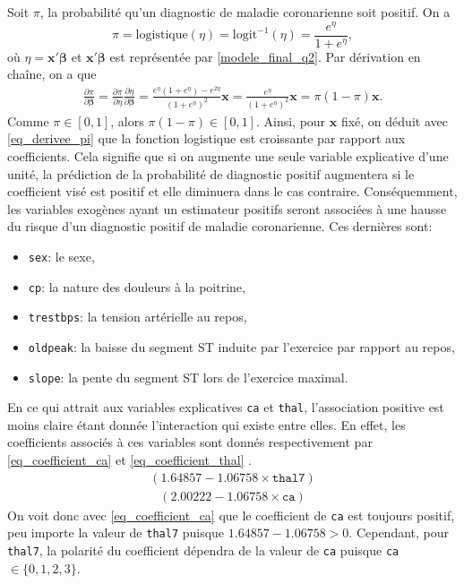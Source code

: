 \documentclass{article}
\begin{document}
	Soit $\pi$, la probabilité qu'un diagnostic de maladie coronarienne soit positif. On a
	$$\pi = \mathrm{logistique}(\eta) = \mathrm{logit}^{-1}(\eta) = \frac{e^{\eta}}{1+e^\eta},$$
	où $\eta = \boldsymbol{x'\beta}$ et $\boldsymbol{x'\beta}$ est représentée par \eqref{modele_final_q2}.
	Par dérivation en chaîne, on a que 
	\begin{align}\label{eq_derivee_pi}
		\frac{\partial\pi}{\partial \boldsymbol{\beta}} 
		= \frac{\partial\pi}{\partial \eta}\frac{\partial\eta}{\partial \boldsymbol{\beta}}
		= \frac{e^\eta (1+e^\eta) - e^{2\eta}}{(1+e^\eta)^2} \boldsymbol{x}
		= \frac{e^\eta}{(1+e^\eta)^2}\boldsymbol{x} 
		= \pi(1-\pi)\boldsymbol{x}.
	\end{align}
	Comme $\pi\in[0,1]$, alors $\pi(1-\pi)\in[0,1]$. Ainsi, pour $\boldsymbol{x}$ fixé, on déduit avec \eqref{eq_derivee_pi} que la fonction logistique est croissante par rapport aux coefficients.
	Cela signifie que si on augmente une seule variable explicative d'une unité, la prédiction de la probabilité de diagnostic positif augmentera si le coefficient visé est positif et elle diminuera dans le cas contraire.
	Conséquemment, les variables exogènes ayant un estimateur positifs seront associées à une hausse du risque d'un diagnostic positif de maladie coronarienne. Ces dernières sont: 
	\begin{itemize}
		\item \texttt{sex}: le sexe,
		\item \texttt{cp}: la nature des douleurs à la poitrine,
		\item \texttt{trestbps}: la tension artérielle au repos,
		\item \texttt{oldpeak}: la baisse du segment ST induite par l’exercice par rapport au repos,
		\item \texttt{slope}: la pente du segment ST lors de l’exercice maximal.
	\end{itemize}

	En ce qui attrait aux variables explicatives \texttt{ca} et \texttt{thal}, l'association positive est moins claire étant donnée l'interaction qui existe entre elles. En effet, les coefficients associés à ces variables sont donnés respectivement par \eqref{eq_coefficient_ca} et \eqref{eq_coefficient_thal} .
	\begin{align}\label{eq_coefficient_ca}
		\left( 1.64857 -1.06758  \times \texttt{thal7}\right)
	\end{align}
	\begin{align}\label{eq_coefficient_thal}
		\left(2.00222 -1.06758  \times \texttt{ca}\right)
	\end{align}
	On voit donc avec \eqref{eq_coefficient_ca} que le coefficient de \texttt{ca} est toujours positif, peu importe la valeur de  \texttt{thal7} puisque $1.64857 -1.06758 > 0$. Cependant, pour \texttt{thal7}, la polarité du coefficient dépendra de la valeur de \texttt{ca} puisque \texttt{ca} $\in \{0, 1, 2, 3\}$.
	
\end{document}
